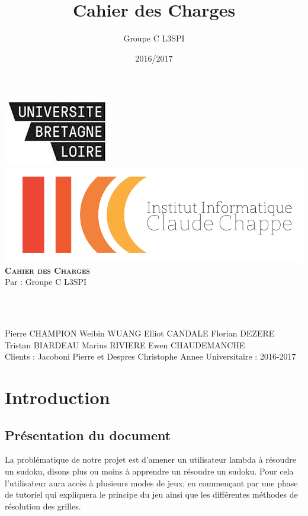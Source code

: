 \documentclass[12pt,a4paper]{article}
\title{Cahier des Charges}
\author{Groupe C L3SPI}
\date{2016/2017}
\begin{document}
	\begin{titlepage} %
    \begin{center}
    \includegraphics[scale=0.6]{logo-UBL.jpg}
    \includegraphics[scale=0.19]{logo_ic2.png} 
    \\[5cm]
    \textsc{\Huge \bfseries {Cahier des Charges}}
    \\[3cm]
    \textrm{Par : Groupe C L3SPI} \strut{}\\[.5ex]\strut{}\\[.5ex]
    \textrm{Pierre CHAMPION}\vfill
    \textrm{Weibin WUANG} \vfill
    \textrm{Elliot CANDALE} \vfill
    \textrm{Florian DEZERE} \vfill
    \textrm{Tristan BIARDEAU} \vfill
    \textrm{Marius RIVIERE} \vfill
    \textrm{Ewen CHAUDEMANCHE} \vfill
    \\[3cm]
    
    \vfill
    \textrm{ Clients : Jacoboni Pierre et Despres Christophe }
    {\newline Annee Universitaire : 2016-2017}
    \end{center}
    \end{titlepage}
    
    \newpage
	\strut
	\newpage
    \tableofcontents
    \newpage
   
    \section{Introduction}
        \subsection{Présentation du document}
        La problématique de notre projet est d'amener un utilisateur lambda à résoudre un sudoku, disons plus ou moins à apprendre un résoudre un sudoku. Pour cela l’utilisateur aura accès à plusieurs modes de jeux; en commençant par une phase de tutoriel qui expliquera le principe du jeu ainsi que les différentes méthodes de résolution des grilles. 
\end{document}
